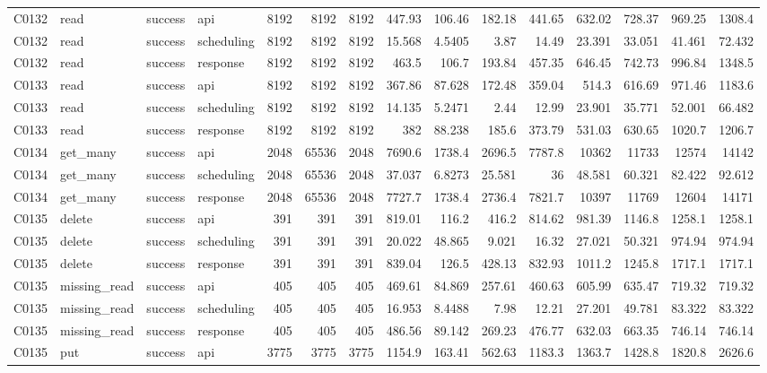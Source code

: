 \begin{landscape}
\begin{longtable}{llllrrrrrrrrrrr}
C0132 & read & success & api & 8192 & 8192 & 8192 & 447.93 & 106.46 & 182.18 & 441.65 & 632.02 & 728.37 & 969.25 & 1308.4\\
C0132 & read & success & scheduling & 8192 & 8192 & 8192 & 15.568 & 4.5405 & 3.87 & 14.49 & 23.391 & 33.051 & 41.461 & 72.432\\
C0132 & read & success & response & 8192 & 8192 & 8192 & 463.5 & 106.7 & 193.84 & 457.35 & 646.45 & 742.73 & 996.84 & 1348.5\\
C0133 & read & success & api & 8192 & 8192 & 8192 & 367.86 & 87.628 & 172.48 & 359.04 & 514.3 & 616.69 & 971.46 & 1183.6\\
C0133 & read & success & scheduling & 8192 & 8192 & 8192 & 14.135 & 5.2471 & 2.44 & 12.99 & 23.901 & 35.771 & 52.001 & 66.482\\
C0133 & read & success & response & 8192 & 8192 & 8192 & 382 & 88.238 & 185.6 & 373.79 & 531.03 & 630.65 & 1020.7 & 1206.7\\
C0134 & get\_\allowbreak{}many & success & api & 2048 & 65536 & 2048 & 7690.6 & 1738.4 & 2696.5 & 7787.8 & 10362 & 11733 & 12574 & 14142\\
C0134 & get\_\allowbreak{}many & success & scheduling & 2048 & 65536 & 2048 & 37.037 & 6.8273 & 25.581 & 36 & 48.581 & 60.321 & 82.422 & 92.612\\
C0134 & get\_\allowbreak{}many & success & response & 2048 & 65536 & 2048 & 7727.7 & 1738.4 & 2736.4 & 7821.7 & 10397 & 11769 & 12604 & 14171\\
C0135 & delete & success & api & 391 & 391 & 391 & 819.01 & 116.2 & 416.2 & 814.62 & 981.39 & 1146.8 & 1258.1 & 1258.1\\
C0135 & delete & success & scheduling & 391 & 391 & 391 & 20.022 & 48.865 & 9.021 & 16.32 & 27.021 & 50.321 & 974.94 & 974.94\\
C0135 & delete & success & response & 391 & 391 & 391 & 839.04 & 126.5 & 428.13 & 832.93 & 1011.2 & 1245.8 & 1717.1 & 1717.1\\
C0135 & missing\_\allowbreak{}read & success & api & 405 & 405 & 405 & 469.61 & 84.869 & 257.61 & 460.63 & 605.99 & 635.47 & 719.32 & 719.32\\
C0135 & missing\_\allowbreak{}read & success & scheduling & 405 & 405 & 405 & 16.953 & 8.4488 & 7.98 & 12.21 & 27.201 & 49.781 & 83.322 & 83.322\\
C0135 & missing\_\allowbreak{}read & success & response & 405 & 405 & 405 & 486.56 & 89.142 & 269.23 & 476.77 & 632.03 & 663.35 & 746.14 & 746.14\\
C0135 & put & success & api & 3775 & 3775 & 3775 & 1154.9 & 163.41 & 562.63 & 1183.3 & 1363.7 & 1428.8 & 1820.8 & 2626.6\\

\end{longtable}
\end{landscape}
